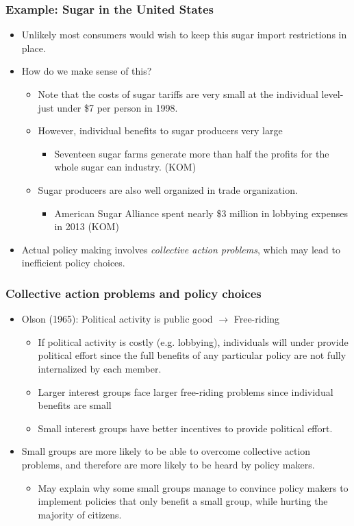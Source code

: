 \documentclass{beamer}
\begin{document}
\begin{frame}
	\frametitle{Example: Sugar in the United States}
\begin{itemize}
   \item Unlikely most consumers would wish to keep this sugar import restrictions in place.
	\item How do we make sense of this?
	\begin{itemize}
		\item Note that the costs of sugar tariffs are very small at the individual level- just under \$7 per person in 1998.
		\item However, individual benefits to sugar producers very large
			\begin{itemize}
				\item Seventeen sugar farms generate more than half the profits for the whole sugar can industry. (KOM)
			\end{itemize}
		\item Sugar producers are also well organized in trade organization.
			\begin{itemize}
				\item American Sugar Alliance spent nearly \$3 million in lobbying expenses in 2013 (KOM)
			\end{itemize}
	\end{itemize}
	\item Actual policy making involves \emph{collective action problems}, which may lead to inefficient policy choices.
\end{itemize}	
\end{frame}

\begin{frame}
\frametitle{Collective action problems and policy choices}

\begin{itemize}
	\item Olson (1965): Political activity is public good $\rightarrow$ Free-riding
		\begin{itemize}
				\item If political activity is costly (e.g. lobbying), individuals will under provide political effort since the full benefits of any particular policy are not fully internalized by each member.
				\item Larger interest groups face larger free-riding problems since individual benefits are small
				\item Small interest groups have better incentives to provide political effort.
		\end{itemize}
	\item Small groups are more likely to be able to overcome collective action problems, and therefore are more likely to be heard by policy makers.
		\begin{itemize}
			\item May explain why some small groups manage to convince policy makers to implement policies that only benefit a small group, while hurting the majority of citizens.
		\end{itemize}
\end{itemize}


\end{frame}
\end{document}
